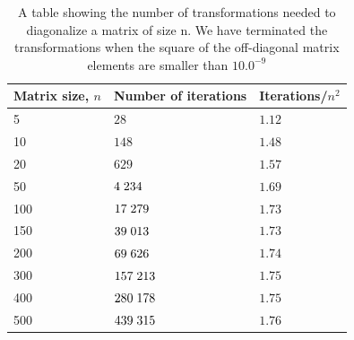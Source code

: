 \documentclass[12pt]{article}
\numberwithin{figure}{section}
\numberwithin{table}{section}
\begin{document}
\begin{table}[h]
\begin{center}
  \begin{tabular}{| l | l | l |}
  \hline
    Matrix size, $n$ &  Number of iterations & Iterations/$n^2$ \\[0.10cm] \hline
     5 & $28$ & $1.12$ \\[0.10cm]
    10 & $148$ & $1.48$ \\[0.10cm]
    20 & $629$& $1.57$ \\[0.10cm]
    50 & $4 \hspace{0.1cm} 234$& $1.69$ \\[0.10cm]
    100 & $17 \hspace{0.1cm} 279$& $1.73$ \\[0.10cm]
    150 & $39 \hspace{0.1cm} 013$& $1.73$ \\[0.10cm]
    200 & $69 \hspace{0.1cm} 626$ & $1.74$ \\[0.10cm]
    300 & $157 \hspace{0.1cm} 213$ & $1.75$ \\[0.10cm]
    400 & $280 \hspace{0.1cm} 178$ & $1.75$ \\[0.10cm]
    500 & $439 \hspace{0.1cm} 315$ & $1.76$ \\[0.10cm]
     \hline
  \end{tabular}
\end{center}
\caption{A table showing the number of transformations needed to diagonalize a matrix of size n. We have terminated the transformations when the square of the off-diagonal matrix elements are smaller than $10.0^{-9}$ }
\label{tab:iterations}
\end{table}
\end{document}
